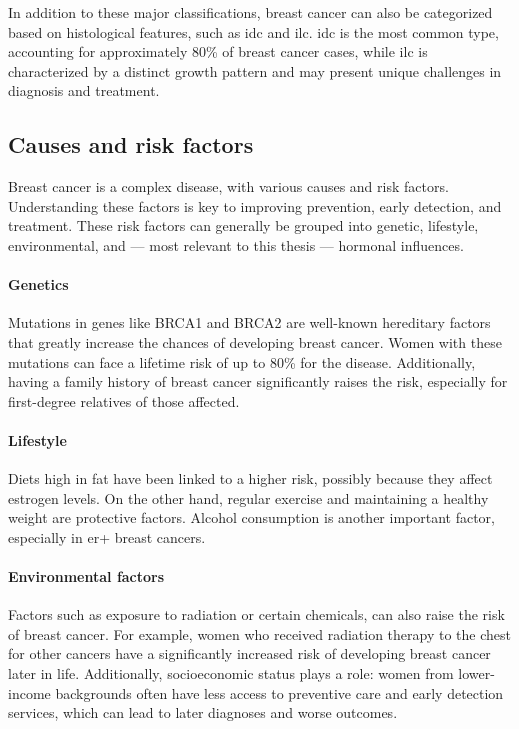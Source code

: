 In addition to these major classifications, breast cancer can also be
categorized based on histological features, such as \gls{idc} and \gls{ilc}.
\Gls{idc} is the most common type, accounting for approximately 80\% of breast
cancer cases, while \gls{ilc} is characterized by a distinct growth pattern and
may present unique challenges in diagnosis and
treatment\supercite{mittal_molecular_nodate}.

\subsection{Causes and risk factors}
\label{sec:brca_risk-factors}

Breast cancer is a complex disease, with various causes and risk factors.
Understanding these factors is key to improving prevention, early detection,
and treatment.
These risk factors can generally be grouped into genetic, lifestyle,
environmental, and — most relevant to this thesis — hormonal
influences\supercite{clusan_basic_2023}.

\paragraph{Genetics}
Mutations in genes like BRCA1 and BRCA2 are well-known hereditary factors that
greatly increase the chances of developing breast cancer.
Women with these mutations can face a lifetime risk of up to 80\% for the
disease\supercite{jian_clinical_2017}.
Additionally, having a family history of breast cancer significantly raises the
risk, especially for first-degree relatives of those
affected\supercite{schairer_risk_2013}.

\paragraph{Lifestyle}
Diets high in fat have been linked to a higher risk, possibly because they
affect estrogen levels\supercite{turner_meta-analysis_2011}.
On the other hand, regular exercise and maintaining a healthy weight are
protective factors\supercite{claudia_admoun_etiology_2022}.
Alcohol consumption is another important factor, especially in \gls{er+} breast
cancers\supercite{bao_association_2011}.

\paragraph{Environmental factors}
Factors such as exposure to radiation or certain chemicals, can also raise the
risk of breast cancer.
For example, women who received radiation therapy to the chest for other
cancers have a significantly increased risk of developing breast cancer later
in life\supercite{froes_brandao_prolactin_2016}.
Additionally, socioeconomic status plays a role: women from lower-income
backgrounds often have less access to preventive care and early detection
services, which can lead to later diagnoses and worse
outcomes\supercite{cunningham_mind_2013}.

